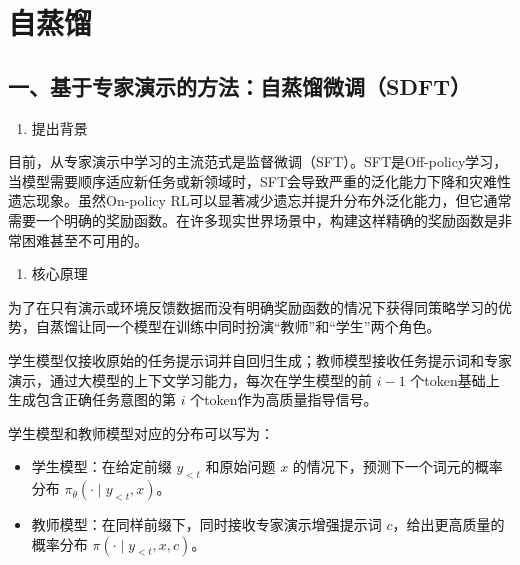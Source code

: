 \setcounter{section}{4}

\hypertarget{ux81eaux84b8ux998f}{%
\section{自蒸馏}\label{ux81eaux84b8ux998f}}

\hypertarget{ux4e00ux57faux4e8eux4e13ux5bb6ux6f14ux793aux7684ux65b9ux6cd5ux81eaux84b8ux998fux5faeux8c03sdft}{%
\subsection{一、基于专家演示的方法：自蒸馏微调（SDFT）}\label{ux4e00ux57faux4e8eux4e13ux5bb6ux6f14ux793aux7684ux65b9ux6cd5ux81eaux84b8ux998fux5faeux8c03sdft}}

\begin{enumerate}
\def\labelenumi{\arabic{enumi}.}
\tightlist
\item
  提出背景
\end{enumerate}

目前，从专家演示中学习的主流范式是监督微调（SFT）。SFT是Off-policy学习，当模型需要顺序适应新任务或新领域时，SFT会导致严重的泛化能力下降和灾难性遗忘现象。虽然On-policy RL可以显著减少遗忘并提升分布外泛化能力，但它通常需要一个明确的奖励函数。在许多现实世界场景中，构建这样精确的奖励函数是非常困难甚至不可用的。

\begin{enumerate}
\def\labelenumi{\arabic{enumi}.}
\setcounter{enumi}{1}
\tightlist
\item
  核心原理
\end{enumerate}

为了在只有演示或环境反馈数据而没有明确奖励函数的情况下获得同策略学习的优势，自蒸馏让同一个模型在训练中同时扮演``教师''和``学生''两个角色。

学生模型仅接收原始的任务提示词并自回归生成；教师模型接收任务提示词和专家演示，通过大模型的上下文学习能力，每次在学生模型的前 \(i-1\) 个token基础上生成包含正确任务意图的第 \(i\) 个token作为高质量指导信号。

学生模型和教师模型对应的分布可以写为：

\begin{itemize}
\tightlist
\item
  学生模型：在给定前缀 \(y_{<t}\) 和原始问题 \(x\) 的情况下，预测下一个词元的概率分布 \(\pi_\theta(\cdot \mid y_{<t}, x)\)。
\item
  教师模型：在同样前缀下，同时接收专家演示增强提示词 \(c\)，给出更高质量的概率分布 \(\pi(\cdot \mid y_{<t}, x, c)\)。
\end{itemize}

